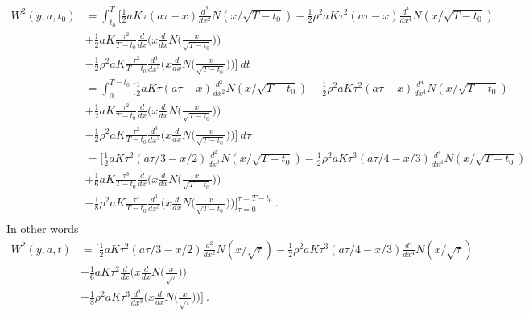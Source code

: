 \documentclass[10pt]{article}
\numberwithin{equation}{section}
\begin{document}
\begin{equation*}
	\begin{split}
	W^{2}(y,a,t_0) &= \int_{t_0}^{T}\biggl[  \frac{1}{2}aK\tau ( a\tau - x ) \frac{d^2}{d x^2} N(x/\sqrt{T-t_0}) -\frac{1}{2}\rho^2 a K \tau^2 (a\tau-x ) \frac{d^4}{dx^4}N(x/\sqrt{T-t_0})\\
	&+ \frac{1}{2}aK\frac{\tau^2}{T-t_0} \frac{d}{dx}\biggl( x \frac{d}{dx}N\biggl( \frac{x}{\sqrt{T-t_0}}\biggr)\biggr)\\ 
	&- \frac{1}{2}\rho^2 aK  \frac{\tau^3}{T-t_0} \frac{d^{3}}{dx^3}\biggl( x \frac{d}{dx}N\biggl( \frac{x}{\sqrt{T-t_0}}\biggr)\biggr) \biggr]\:dt\\
	&= \int_{0}^{T-t_0}\biggl[  \frac{1}{2}aK\tau ( a\tau - x ) \frac{d^2}{d x^2} N(x/\sqrt{T-t_0}) -\frac{1}{2}\rho^2 a K \tau^2 (a\tau-x ) \frac{d^4}{dx^4}N(x/\sqrt{T-t_0})\\
	&+ \frac{1}{2}aK \frac{\tau^2}{T-t_0} \frac{d}{dx}\biggl( x \frac{d}{dx}N\biggl( \frac{x}{\sqrt{T-t_0}}\biggr)\biggr)\\ 
	&- \frac{1}{2}\rho^2 aK \frac{\tau^3}{T-t_0} \frac{d^{3}}{dx^3}\biggl( x \frac{d}{dx}N\biggl( \frac{x}{\sqrt{T-t_0}}\biggr)\biggr) \biggr]\:d\tau\\
	&= \biggl[  \frac{1}{2}aK\tau^2 ( a\tau/3 - x/2 ) \frac{d^2}{d x^2} N(x/\sqrt{T-t_0}) -\frac{1}{2}\rho^2 a K \tau^3 (a\tau/4-x/3 ) \frac{d^4}{dx^4}N(x/\sqrt{T-t_0})\\
	&+ \frac{1}{6}aK \frac{\tau^3}{T-t_0} \frac{d}{dx}\biggl( x \frac{d}{dx}N\biggl( \frac{x}{\sqrt{T-t_0}}\biggr)\biggr)\\ 
	&- \frac{1}{8}\rho^2 aK \frac{\tau^4}{ T-t_0} \frac{d^{3}}{dx^3}\biggl( x \frac{d}{dx}N\biggl( \frac{x}{\sqrt{T-t_0}}\biggr)\biggr) \biggr]_{\tau = 0}^{\tau = T-t_0}\:.\\
	\end{split}
\end{equation*}
In other words
\begin{equation*}
	\begin{split}
	W^{2}(y,a,t) &=  \biggl[  \frac{1}{2}aK\tau^2 ( a\tau/3 - x/2 ) \frac{d^2}{d x^2} N(x/\sqrt{\tau}) -\frac{1}{2}\rho^2 a K \tau^3 (a\tau/4-x/3 ) \frac{d^4}{dx^4}N(x/\sqrt{\tau})\\
	&+ \frac{1}{6}aK \tau^{2} \frac{d}{dx}\biggl( x \frac{d}{dx}N\biggl( \frac{x}{\sqrt{\tau}}\biggr)\biggr)\\ 
	&- \frac{1}{8}\rho^2 aK \tau^{3} \frac{d^{3}}{dx^3}\biggl( x \frac{d}{dx}N\biggl( \frac{x}{\sqrt{\tau}}\biggr)\biggr) \biggr]\:.
	\end{split}
\end{equation*}


\end{document}
